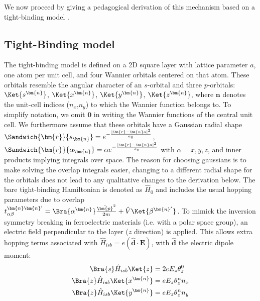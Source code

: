 We now proceed by giving a pedagogical derivation of this mechanism based on a tight-binding model \cite{Petersen2000,Go2016}.

\subsection{Tight-Binding model}
The tight-binding model is defined on a 2D square layer with lattice parameter $a$, one atom per unit cell, and four Wannier orbitals centered on that atom.
These orbitals resemble the angular character of an $s$-orbital and three $p$-orbitals: $\Ket{s^{\bm{n}}}$, $\Ket{x^{\bm{n}}}$, $\Ket{y^{\bm{n}}}$, $\Ket{z^{\bm{n}}}$, where $\bm{n}$ denotes the unit-cell indices ($n_x$,$n_y$) to which the Wannier function belongs to.
To simplify notation, we omit $\bm{0}$ in writing the Wannier functions of the central unit cell.
We furthermore assume that these orbitals have a Gaussian radial shape $\Sandwich{\bm{r}}{s_{\bm{n}}} = e^{-\frac{|\bm{r}-\bm{n}a|^2}{a_0}}$, $\Sandwich{\bm{r}}{\alpha_{\bm{n}}} = \alpha e^{-\frac{|\bm{r}-\bm{n}a|^2}{a_0}}$ with $\alpha = x, y, z$, and inner products implying integrals over space.
The reason for choosing gaussians is to make solving the overlap integrals easier, changing to a different radial shape for the orbitals does not lead to any qualitative changes to the derivation below.
The bare tight-binding Hamiltonian is denoted as $\hat{H}_0$ and includes the usual hopping parameters due to overlap $t_{\alpha\beta}^{\bm{n}\bm{n}'} = \Bra{\alpha^{\bm{n}}}\frac{\hat{\bm{p}}^2}{2m} + \hat{V}\Ket{\beta^{\bm{n}'}}$.
To mimick the inversion symmetry breaking in ferroelectric materials (i.e. with a polar space group), an electric field perpendicular to the layer ($z$ direction) is applied.
This allows extra hopping terms associated with $\hat{H}_{isb} = e (\hat{\bm{d}}\cdot \bm{E})$, with $\hat{\bm{d}}$ the electric dipole moment:
\begin{align}
	\label{eq:dipole}
	\Bra{s} \hat{H}_{isb} \Ket{z} &= 2 e E_z \theta_z^0\\
	\Bra{z} \hat{H}_{isb} \Ket{x^{\bm{n}}} &= e E_z \theta_z^n n_x\\
	\Bra{z} \hat{H}_{isb} \Ket{y^{\bm{n}}} &= e E_z \theta_z^n n_y
\end{align}

